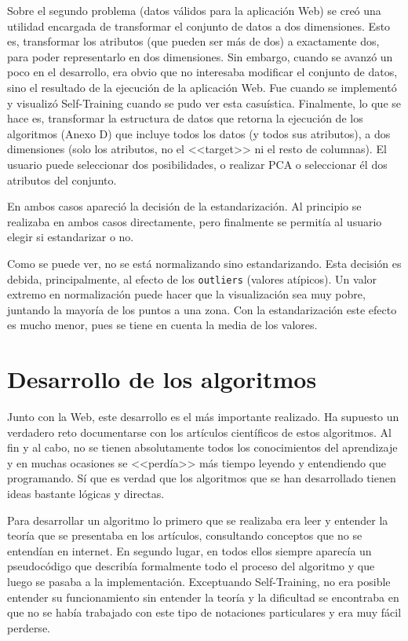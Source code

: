 Sobre el segundo problema (datos válidos para la aplicación Web) se creó una
utilidad encargada de transformar el conjunto de datos a dos dimensiones. Esto
es, transformar los atributos (que pueden ser más de dos) a exactamente dos,
para poder representarlo en dos dimensiones. Sin embargo, cuando se avanzó un
poco en el desarrollo, era obvio que no interesaba modificar el conjunto de
datos, sino el resultado de la ejecución de la aplicación Web. Fue cuando se
implementó y visualizó Self-Training cuando se pudo ver esta casuística.
Finalmente, lo que se hace es, transformar la estructura de datos que retorna la
ejecución de los algoritmos (Anexo D) que incluye todos los datos (y todos sus
atributos), a dos dimensiones (solo los atributos, no el <<target>> ni el resto
de columnas). El usuario puede seleccionar dos posibilidades, o realizar PCA o
seleccionar él dos atributos del conjunto.

En ambos casos apareció la decisión de la estandarización. Al principio se
realizaba en ambos casos directamente, pero finalmente se permitía al usuario
elegir si estandarizar o no.

Como se puede ver, no se está normalizando sino estandarizando. Esta decisión es
debida, principalmente, al efecto de los \texttt{outliers} (valores atípicos).
Un valor extremo en normalización puede hacer que la visualización sea muy
pobre, juntando la mayoría de los puntos a una zona. Con la estandarización este
efecto es mucho menor, pues se tiene en cuenta la media de los valores.

\clearpage
\section{Desarrollo de los algoritmos}

Junto con la Web, este desarrollo es el más importante realizado. Ha supuesto un verdadero reto documentarse
con los artículos científicos de estos algoritmos. Al fin y al cabo, no se tienen absolutamente todos los conocimientos
del aprendizaje y en muchas ocasiones se <<perdía>> más tiempo leyendo y entendiendo que programando. Sí que es verdad que 
los algoritmos que se han desarrollado tienen ideas bastante lógicas y directas.

Para desarrollar un algoritmo lo primero que se realizaba era leer y entender la
teoría que se presentaba en los artículos, consultando conceptos que no se
entendían en internet. En segundo lugar, en todos ellos siempre aparecía un
pseudocódigo que describía formalmente todo el proceso del algoritmo y que luego
se pasaba a la implementación. Exceptuando Self-Training, no era posible
entender su funcionamiento sin entender la teoría y la dificultad se encontraba
en que no se había trabajado con este tipo de notaciones particulares y era muy
fácil perderse.

